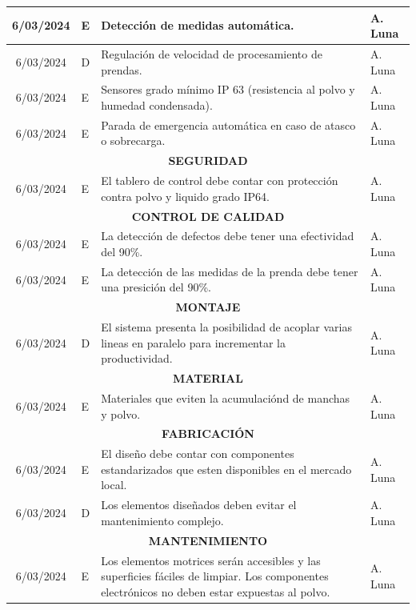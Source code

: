 \begin{longtable}{|c|p{4.5em}|p{22.5em}|p{6em}|}
	\hline
	6/03/2024 & E     & Detección de medidas automática. & A. Luna \bigstrut\\
	\hline
	6/03/2024 & D     & Regulación de velocidad de procesamiento de prendas. & A. Luna \bigstrut\\
	\hline
	6/03/2024 & E     & Sensores grado mínimo IP 63 (resistencia al polvo y humedad condensada). & A. Luna \bigstrut\\
	\hline
	6/03/2024 & E     & Parada de emergencia automática en caso de atasco o sobrecarga. & A. Luna \bigstrut\\
	\hline
	\multicolumn{4}{|p{37.5em}|}{\textbf{SEGURIDAD}} \bigstrut\\
	\hline
	6/03/2024 & E     & El tablero de control debe contar con protección contra polvo y liquido grado IP64. & A. Luna \bigstrut\\
	\hline
	\multicolumn{4}{|p{37.5em}|}{\textbf{CONTROL DE CALIDAD}} \bigstrut\\
	\hline
	6/03/2024 & E     & La detección de defectos debe tener una efectividad del 90\%. & A. Luna \bigstrut\\
	\hline
	6/03/2024 & E     & La detección de las medidas de la prenda debe tener una presición del 90\%. & A. Luna \bigstrut\\
	\hline
	\multicolumn{4}{|p{37.5em}|}{\textbf{MONTAJE}} \bigstrut\\
	\hline
	6/03/2024 & D     & El sistema presenta la posibilidad de acoplar varias lineas en paralelo para incrementar la productividad. & A. Luna \bigstrut\\
	\hline
	\multicolumn{4}{|p{37.5em}|}{\textbf{MATERIAL}} \bigstrut\\
	\hline
	6/03/2024 & E     & Materiales que eviten la acumulaciónd de manchas y polvo. & A. Luna \bigstrut\\
	\hline
	\multicolumn{4}{|p{37.5em}|}{\textbf{FABRICACIÓN}} \bigstrut\\
	\hline
	6/03/2024 & E     & El diseño debe contar con componentes estandarizados que esten disponibles en el mercado local. & A. Luna \bigstrut\\
	\hline
	6/03/2024 & D     & Los elementos diseñados deben evitar el mantenimiento complejo. & A. Luna \bigstrut\\
	\hline
	\multicolumn{4}{|p{37.5em}|}{\textbf{MANTENIMIENTO}} \bigstrut\\
	\hline
	6/03/2024 & E     & Los elementos motrices serán accesibles y las superficies fáciles de limpiar. Los componentes electrónicos no deben estar expuestas al polvo. & A. Luna \bigstrut\\

\end{longtable}
